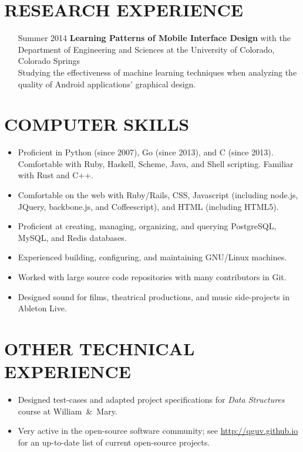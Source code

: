\documentclass{res}     %
\begin{document}
\begin{resume}
\section{RESEARCH EXPERIENCE}
\vspace{5mm}
\begin{itemize}[font=\itshape,align=parleft,labelwidth=3cm,leftmargin=2cm]
    \item[Summer 2014]
        \textbf{Learning Patterns of Mobile Interface Design}
        with the Department of Engineering and Sciences
        at the University of Colorado, Colorado Springs
        \vspace{1mm} \\
        Studying the effectiveness of machine learning techniques when analyzing the quality of Android applications' graphical design.
\end{itemize}

\section{COMPUTER SKILLS}
\vspace{5mm}
\begin{itemize}[leftmargin=5mm]
\item Proficient in Python (since 2007), Go (since 2013), and C (since 2013). Comfortable with Ruby, Haskell, Scheme, Java, and Shell scripting. Familiar with Rust and C++.
\item Comfortable on the web with Ruby/Rails, CSS, Javascript (including node.js, JQuery, backbone.js, and Coffeescript), and HTML (including HTML5).
\item Proficient at creating, managing, organizing, and querying PostgreSQL, MySQL, and Redis databases.
\item Experienced building, configuring, and maintaining GNU/Linux machines.
\item Worked with large source code repositories with many contributors in Git.
\item Designed sound for films, theatrical productions, and music side-projects in Ableton Live.
\end{itemize}
 
\section{OTHER TECHNICAL EXPERIENCE}
\vspace{5mm}
\begin{itemize}[leftmargin=5mm]
\item Designed test-cases and adapted project specifications for \emph{Data Structures} course at William~\&~Mary.
\item Very active in the open-source software community; see \url{http://qguv.github.io} for an up-to-date list of current open-source projects.
\end{itemize}


\end{resume}
\end{document}
